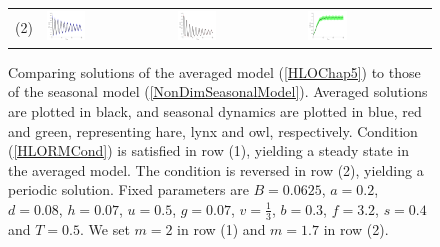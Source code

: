 \documentclass[12pt]{UOthesis}
\theoremstyle{remarkstyle}
\begin{document}
\begin{figure}[h!]
\begin{tabular}{m{0.07cm} m{4.5cm}  m{4.5cm}  m{4.5cm}}
		(2) & \includegraphics[width=0.33\textwidth]{HLOSolComparePOHare1.png} & \includegraphics[width=0.33\textwidth]{HLOSolComparePOLynx1.png} & \includegraphics[width=0.33\textwidth]{HLOSolComparePOOwl1.png}\\
	\end{tabular}
	\caption[Comparing averaged and seasonal solutions of the original model]{Comparing solutions of the averaged model (\ref{HLOChap5}) to those of the seasonal model (\ref{NonDimSeasonalModel}). Averaged solutions are plotted in black, and seasonal dynamics are plotted in blue, red and green, representing hare, lynx and owl, respectively. Condition (\ref{HLORMCond}) is satisfied in row (1), yielding a steady state in the averaged model. The condition is reversed in row (2), yielding a periodic solution. Fixed parameters are $B=0.0625$, $a=0.2$, $d=0.08$, $h=0.07$, $u=0.5$, $g=0.07$, $v=\frac{1}{3}$, $b=0.3$, $f=3.2$, $s=0.4$ and $T=0.5$. We set $m=2$ in row (1) and $m=1.7$ in row (2).\label{HLOSolCompare}}%
\end{figure}
\end{document}
